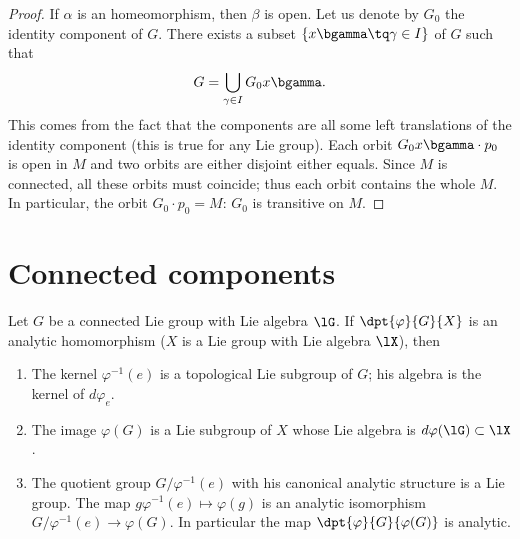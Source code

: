 \begin{proof}
	If $\alpha$ is an homeomorphism, then $\beta$ is open. Let us denote by $G_0$ the identity component of $G$. There exists a subset $\{x\bgamma\tq\gamma\in I\}$ of $G$ such that
	\[
		G=\bigcup_{\gamma\in I}G_0x\bgamma.
	\]
	This comes from the fact that the components are all some left translations of the identity component (this is true for any Lie group). Each orbit $G_0x\bgamma\cdot p_0$ is open in $M$ and two orbits are either disjoint either equals. Since $M$ is connected, all these orbits must coincide; thus each orbit contains the whole $M$. In particular, the orbit $G_0\cdot p_0=M$: $G_0$ is transitive on $M$.

\end{proof}

\section{Connected components}

\begin{lemma}\label{lem:vp_G_X}
	Let $G$ be a connected Lie group with Lie algebra $\lG$. If $\dpt{\varphi}{G}{X}$ is an analytic homomorphism ($X$ is a Lie group with Lie algebra $\lX$), then

	\begin{enumerate}
		\item The kernel $\varphi^{-1}(e)$ is a topological Lie subgroup of $G$; his algebra is the kernel of $d\varphi_e$.
		\item The image $\varphi(G)$ is a Lie subgroup of $X$ whose Lie algebra is $d\varphi(\lG)\subset\lX$.
		\item The quotient group $G/\varphi^{-1}(e)$ with his canonical analytic structure is a Lie group. The map $g\varphi^{-1}(e)\mapsto\varphi(g)$ is an analytic isomorphism $G/\varphi^{-1}(e)\to\varphi(G)$. In particular the map $\dpt{\varphi}{G}{\varphi(G)}$ is analytic.
	\end{enumerate}
\end{lemma}

